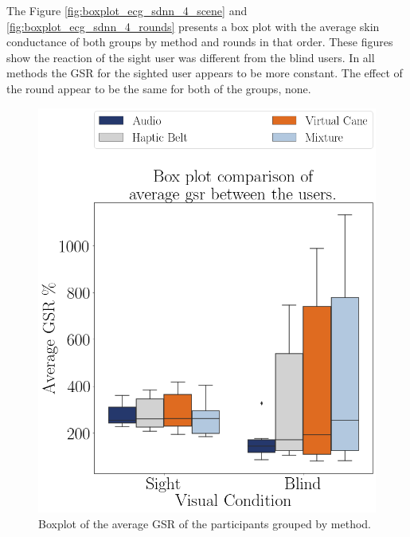 The Figure \ref{fig:boxplot_ecg_sdnn_4_scene} and \ref{fig:boxplot_ecg_sdnn_4_rounds} presents a box plot with the average skin conductance of both groups by method and rounds in that order. These figures show the reaction of the sight user was different from the blind users. In all methods the GSR for the sighted user appears to be more constant. The effect of the round appear to be the same for both of the groups, none.

\begin{figure}[!htb]
    \centering
    \begin{minipage}{0.45\textwidth}
        \centering
        \includegraphics[width = 0.8\linewidth]{Resultados/GSR/Figuras/png/boxplot_gsr_avg_4_scene.png}
        \caption{Boxplot of the average GSR of the participants grouped by method.}
        \label{fig:boxplot_gsr_avg_4_scene}
    \end{minipage}
    \begin{minipage}{0.45\textwidth}
        \centering

\end{minipage}
\end{figure}
